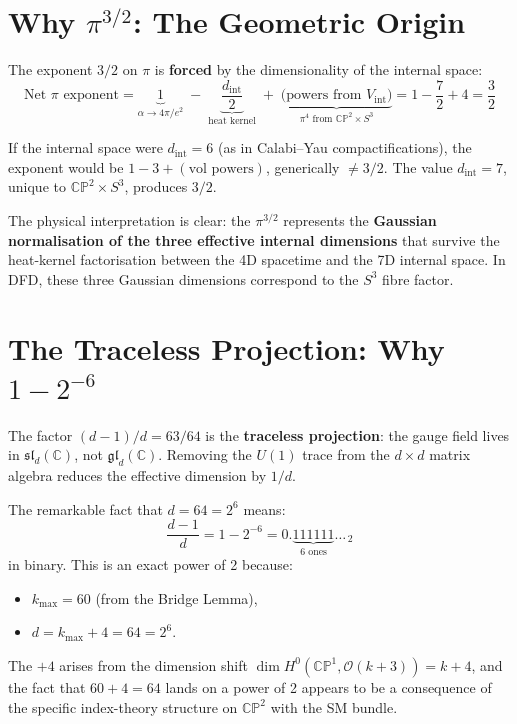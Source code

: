 \documentclass[11pt]{article}
\newcommand{\CP}{\mathbb{CP}}
\begin{document}
\section{Why $\pi^{3/2}$: The Geometric Origin}
\label{sec:pi32}

The exponent $3/2$ on $\pi$ is \textbf{forced} by the dimensionality of
the internal space:
\begin{equation}
\text{Net } \pi \text{ exponent}
= \underbrace{1}_{\alpha \to 4\pi/e^2}
\;-\; \underbrace{\frac{d_{\mathrm{int}}}{2}}_{\text{heat kernel}}
\;+\; \underbrace{\text{(powers from } V_{\mathrm{int}})}_{\pi^4 \text{ from }
\CP^2 \times S^3}
= 1 - \frac{7}{2} + 4 = \frac{3}{2}
\label{eq:pi-power}
\end{equation}

If the internal space were $d_{\mathrm{int}} = 6$ (as in Calabi--Yau
compactifications), the exponent would be $1 - 3 + (\text{vol powers})$,
generically $\neq 3/2$.  The value $d_{\mathrm{int}} = 7$, unique to
$\CP^2 \times S^3$, produces $3/2$.

The physical interpretation is clear: the $\pi^{3/2}$ represents the
\textbf{Gaussian normalisation of the three effective internal dimensions}
that survive the heat-kernel factorisation between the 4D spacetime and
the 7D internal space.  In DFD, these three Gaussian dimensions correspond
to the $S^3$ fibre factor.


\section{The Traceless Projection: Why $1 - 2^{-6}$}
\label{sec:traceless}

The factor $(d{-}1)/d = 63/64$ is the \textbf{traceless projection}:
the gauge field lives in $\mathfrak{sl}_d(\mathbb{C})$, not
$\mathfrak{gl}_d(\mathbb{C})$.  Removing the $U(1)$ trace from the
$d \times d$ matrix algebra reduces the effective dimension by $1/d$.

The remarkable fact that $d = 64 = 2^6$ means:
\begin{equation}
\frac{d-1}{d} = 1 - 2^{-6}
= 0.\underbrace{111111}_{6 \text{ ones}}\ldots_{\,2}
\end{equation}
in binary.  This is an exact power of 2 because:
\begin{itemize}
\item $k_{\max} = 60$ (from the Bridge Lemma),
\item $d = k_{\max} + 4 = 64 = 2^6$.
\end{itemize}
The $+4$ arises from the dimension shift
$\dim H^0(\CP^1, \mathcal{O}(k{+}3)) = k + 4$, and the fact that
$60 + 4 = 64$ lands on a power of 2 appears to be a consequence of
the specific index-theory structure on $\CP^2$ with the SM bundle.
\end{document}
